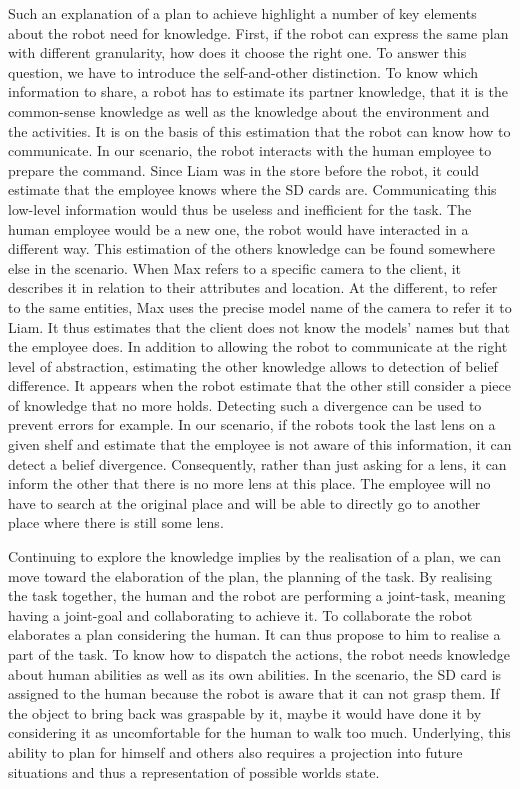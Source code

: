 Such an explanation of a plan to achieve highlight a number of key elements about the robot need for knowledge. First, if the robot can express the same plan with different granularity, how does it choose the right one. To answer this question, we have to introduce the self-and-other distinction. To know which information to share, a robot has to estimate its partner knowledge, that it is the common-sense knowledge as well as the knowledge about the environment and the activities. It is on the basis of this estimation that the robot can know how to communicate. In our scenario, the robot interacts with the human employee to prepare the command. Since Liam was in the store before the robot, it could estimate that the employee knows where the SD cards are. Communicating this low-level information would thus be useless and inefficient for the task. The human employee would be a new one, the robot would have interacted in a different way. This estimation of the others knowledge can be found somewhere else in the scenario. When Max refers to a specific camera to the client, it describes it in relation to their attributes and location. At the different, to refer to the same entities, Max uses the precise model name of the camera to refer it to Liam. It thus estimates that the client does not know the models' names but that the employee does. In addition to allowing the robot to communicate at the right level of abstraction, estimating the other knowledge allows to detection of belief difference. It appears when the robot estimate that the other still consider a piece of knowledge that no more holds. Detecting such a divergence can be used to prevent errors for example. In our scenario, if the robots took the last lens on a given shelf and estimate that the employee is not aware of this information, it can detect a belief divergence. Consequently, rather than just asking for a lens, it can inform the other that there is no more lens at this place. The employee will no have to search at the original place and will be able to directly go to another place where there is still some lens.

Continuing to explore the knowledge implies by the realisation of a plan, we can move toward the elaboration of the plan, the planning of the task. By realising the task together, the human and the robot are performing a joint-task, meaning having a joint-goal and collaborating to achieve it. To collaborate the robot elaborates a plan considering the human. It can thus propose to him to realise a part of the task. To know how to dispatch the actions, the robot needs knowledge about human abilities as well as its own abilities. In the scenario, the SD card is assigned to the human because the robot is aware that it can not grasp them. If the object to bring back was graspable by it, maybe it would have done it by considering it as uncomfortable for the human to walk too much. Underlying, this ability to plan for himself and others also requires a projection into future situations and thus a representation of possible worlds state.

